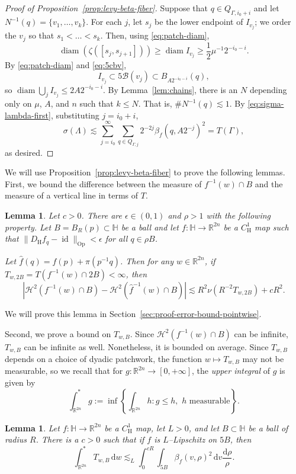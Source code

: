 \documentclass[12pt,reqno]{amsart}
\newcommand{\cB}{\mathcal{B}}
\newcommand{\cH}{\mathcal{H}}
\newcommand{\DfH}{D_\mathrm{H}f}
\newcommand{\HH}{\mathbb{H}}
\newcommand{\R}{\mathbb{R}}
\newcommand{\ud}[0]{\,\mathrm{d}}
\newcommand{\from}{\colon}
\newtheorem{lemma}[thm]{Lemma}
\theoremstyle{remark}
\newcommand{\0}{\mathbf{0}}
\renewcommand{\1}{\mathbf 1}
\DeclareMathOperator{\diam}{diam}
\DeclareMathOperator{\id}{id}
\begin{document}
\begin{proof}[Proof of Proposition~\ref{prop:levy-beta-fiber}]
  Suppose that $q\in Q_{\Gamma, i_0 + i}$ and let $N^{-1}(q) = \{v_1,\dots, v_k\}$. For each $j$, let $s_j$ be the lower endpoint of $I_{v_j}$; we order the $v_j$ so that $s_1 < \dots < s_k$. Then, using \eqref{eq:patch-diam},
  $$
  \diam(\zeta([s_j,s_{j+1}]))\ge \diam I_{v_j} \ge \frac{1}{2}\mu^{-1} 2^{- i_0 - i}.
  $$
  By \eqref{eq:patch-diam} and \eqref{eq:5cbv},
  $$I_{v_j} \subset 5\cB(v_j) \subset B_{A 2^{- i_0 - i}}(q),$$
  so $\diam \bigcup_j I_{v_j} \le 2 A 2^{- i_0 - i}$. By  Lemma~\ref{lem:chains}, there is an $N$ depending only on $\mu$, $A$, and $n$ such that $k\le N$. That is, $\#N^{-1}(q)\lesssim 1$. By \eqref{eq:sigma-lambda-first}, substituting $j=i_0+i$,
  $$\sigma(\Lambda) \lesssim \sum_{j=i_0}^\infty \sum_{q\in Q_{\Gamma, j}} 2^{-2j} \beta_f(q, A 2^{- j})^2 = T(\Gamma),$$
  as desired.
\end{proof}

We will use Proposition~\ref{prop:levy-beta-fiber} to prove the following lemmas. First, we bound the difference between the measure of $f^{-1}(w)\cap B$ and the measure of a vertical line in terms of $T$.
\begin{lemma} \label{lem:error-bound-pointwise}
  Let $c>0$. There are $\epsilon \in (0,1)$ and $\rho > 1$ with the following property. Let $B = B_R(p) \subset \HH$ be a ball and let $f\from \HH\to \R^{2n}$ be a $C^1_{\mathrm{H}}$ map such that $\|\DfH_q - \id\|_{\mathrm{Op}} < \epsilon$ for all $q\in \rho B$.

  Let $\hat{f}(q) = f(p) + \pi(p^{-1}q)$.
  Then for any $w\in \R^{2n}$, if $T_{w,2B}=T(f^{-1}(w)\cap 2B)<\infty$, then
  \begin{equation}\label{eq:error-equation-f-pi}
    |\cH^2(f^{-1}(w)\cap B) - \cH^2(\hat{f}^{-1}(w)\cap B)| \lesssim R^2 \nu\left(R^{-2} T_{w,2B}\right) + c R^2.
  \end{equation}
\end{lemma}
We will prove this lemma in Section~\ref{sec:proof-error-bound-pointwise}.

Second, we prove a bound on $T_{w,B}$. Since $\cH^2(f^{-1}(w)\cap B)$ can be infinite, $T_{w,B}$ can be infinite as well. Nonetheless, it is bounded on average. Since $T_{w,B}$ depends on a choice of dyadic patchwork, the function $w\mapsto T_{w,B}$ may not be measurable, so we recall that for $g\from\mathbb R^{2n}\to[0,+\infty]$, the \emph{upper integral} of $g$ is given by
\[
\int_{\mathbb R^{2n}}^*g :=\inf\left\{\int_{\mathbb R^{2n}}h:g\leq h,\,\,\text{$h$ measurable}\right\}.
\]

\begin{lemma}\label{lem:fubini}
  Let $f\from \HH \to \R^{2n}$ be a $C^1_{\mathrm{H}}$ map, let $L>0$, and let $B\subset \HH$ be a ball of radius $R$. There is a $c > 0$ such that if $f$ is $L$--Lipschitz on $5 B$, then 
  \begin{equation}\label{eq:fubini}
    \int^*_{\R^{2n}} T_{w,B}\ud w \lesssim_L \int_0^{c R} \int_{5B}\beta_f(v, \rho)^2 \ud v \frac{\mathrm d\rho}{\rho}.
  \end{equation}
\end{lemma}
\end{document}
